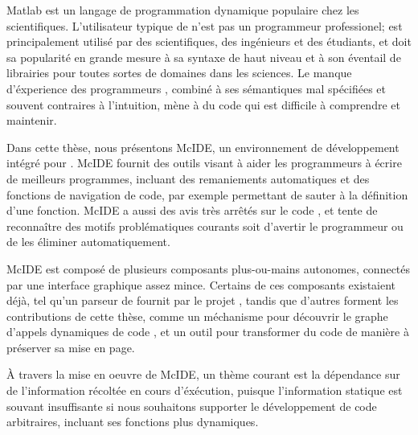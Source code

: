 {\sc Matlab}\textsuperscript{\textregistered} est un langage de programmation
dynamique populaire chez les scientifiques. L'utilisateur typique de \matlab
n'est pas un programmeur professionel; \matlab est
principalement utilis\'{e} par des scientifiques, des ing\'{e}nieurs et des
\'{e}tudiants, et doit sa popularit\'{e} en grande mesure \`{a} sa syntaxe de
haut niveau et \`{a} son \'{e}ventail de librairies pour toutes sortes de
domaines dans les sciences. Le manque d'\'{e}xperience des programmeurs
\matlab, combin\'{e} \`{a} ses s\'{e}mantiques mal sp\'{e}cifi\'{e}es et
souvent contraires \`{a} l'intuition, m\`{e}ne \`{a} du code \matlab qui est
difficile \`{a} comprendre et maintenir.

Dans cette th\`{e}se, nous pr\'{e}sentons McIDE, un environnement de
d\'{e}veloppement int\'{e}gr\'{e} pour \matlab. McIDE fournit des outils visant
\`{a} aider les programmeurs \matlab \`{a} \'{e}crire de meilleurs programmes,
incluant des remaniements automatiques et des fonctions de navigation de code,
par exemple permettant de sauter \`{a} la d\'{e}finition d'une fonction. McIDE
a aussi des avis tr\`{e}s arr\^{e}t\'{e}s sur le code \matlab, et tente de
reconna\^{i}tre des motifs probl\'{e}matiques courants soit d'avertir le
programmeur ou de les \'{e}liminer automatiquement.

McIDE est compos\'{e} de plusieurs composants plus-ou-mains autonomes,
connect\'{e}s par une interface graphique assez mince. Certains de ces
composants existaient d\'{e}j\`{a}, tel qu'un parseur de \matlab fournit par le
projet \mclab, tandis que d'autres forment les contributions de cette
th\`{e}se, comme un m\'{e}chanisme pour d\'{e}couvrir le graphe d'appels
dynamiques de code \matlab, et un outil pour transformer du code de mani\`{e}re
\`{a} pr\'{e}server sa mise en page.

\`{A} travers la mise en oeuvre de McIDE, un th\`{e}me courant est la
d\'{e}pendance sur de l'information r\'{e}colt\'{e}e en cours
d'\'{e}x\'{e}cution, puisque l'information statique est souvant insuffisante si
nous souhaitons supporter le d\'{e}veloppement de code \matlab arbitraires,
incluant ses fonctions plus dynamiques.
